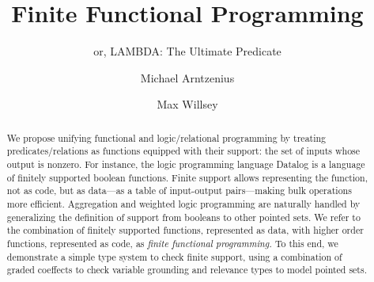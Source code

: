 \documentclass[runningheads]{llncs}
\title{Finite Functional Programming}
\subtitle{or, LAMBDA: The Ultimate Predicate}
\author{Michael Arntzenius\orcidID{0009-0002-0417-5636}
  \and Max Willsey\orcidID{0000-0001-8066-4218}
}
\institute{University of California, Berkeley, USA\\
\email{daekharel@gmail.com}}
\newcommand\todo[1]{{\color{IndianRed}#1}}
\newcommand\<\:                 %
\begin{document}
\maketitle              %

\begin{abstract}
We propose unifying functional and logic/relational programming by treating predicates/relations as functions equipped with their support: the set of inputs whose output is nonzero.
For instance, the logic programming language Datalog is a language of finitely supported boolean functions.
Finite support allows representing the function, not as code, but as data---as a table of input-output pairs---making bulk operations more efficient.
Aggregation and weighted logic programming are naturally handled by generalizing the definition of support from booleans to other pointed sets.
We refer to the combination of finitely supported functions, represented as data, with higher order functions, represented as code, as \emph{finite functional programming.}
To this end, we demonstrate a simple type system to check finite support, using a combination of graded coeffects to check variable grounding and relevance types to model pointed sets.


\end{abstract}
\end{document}
